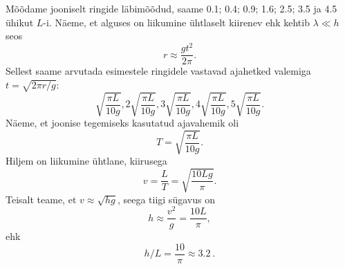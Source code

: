 {\ifSolution
Mõõdame jooniselt ringide läbimõõdud, saame \num{0,1}; \num{0,4}; \num{0,9}; \num{1,6}; \num{2,5}; \num{3,5} ja \num{4,5} ühikut $L$-i. Näeme, et alguses on liikumine ühtlaselt kiirenev ehk kehtib $\lambda \ll h$ seos
\[
r \approx \frac{gt^2}{2 \pi}.
\]
Sellest saame arvutada esimestele ringidele vastavad ajahetked valemiga $t = \sqrt{2 \pi r/g}$: 
\[
\sqrt{\frac{\pi L}{10 g}}, 2 \sqrt{\frac{\pi L}{10 g}}, 3 \sqrt{\frac{\pi L}{10 g}}, 4 \sqrt{\frac{\pi L}{10 g}}, 5 \sqrt{\frac{\pi L}{10 g}}.
\]
Näeme, et joonise tegemiseks kasutatud ajavahemik oli
\[
T=\sqrt{\frac{\pi L}{10 g}}.
\]
Hiljem on liikumine ühtlane, kiirusega
\[
v=\frac{L}{T}=\sqrt{\frac{10 L g}{\pi}}.
\]
Teisalt teame, et $v \approx \sqrt{hg}$, seega tiigi sügavus on
\[
h \approx \frac{v^2}{g} = \frac{10 L}{\pi},
\]
ehk 
\[
h/L = \frac{10}{\pi} \approx \SI{3,2}{}.
\]
\fi


}
